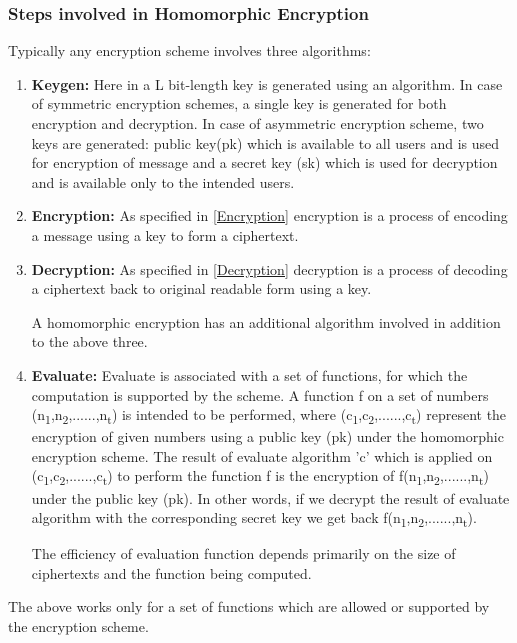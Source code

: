\subsubsection{Steps involved in Homomorphic Encryption} \label{steps}
Typically any encryption scheme involves three algorithms:
\begin{enumerate}

    \item 
    \textbf{Keygen:} Here in a L bit-length key is generated using an algorithm. In case of symmetric encryption schemes, a single key is generated for both encryption and decryption. In case of asymmetric encryption scheme, two keys are generated: public key(pk) which is available to all users and is used for encryption of message and a secret key (sk) which is used for decryption and is available only to the intended users.
   
   \item
    \textbf{Encryption:} As specified in \ref{Encryption} encryption is a process of encoding a message using a key to form a ciphertext.
   
    \item
    \textbf{Decryption:} As specified in \ref{Decryption} decryption is a process of decoding a ciphertext back to original readable form using a key.
   
   \noindent A homomorphic encryption has an additional algorithm involved in addition to the above three.
   
    \item 
     \textbf{Evaluate:} Evaluate is associated with a set of functions, for which the computation is supported by the scheme. A function f on a set of numbers (n\textsubscript{1},n\textsubscript{2},......,n\textsubscript{t}) is intended to be performed, where (c\textsubscript{1},c\textsubscript{2},......,c\textsubscript{t}) represent the encryption of given numbers using a public key (pk) under the homomorphic encryption scheme. The result of evaluate algorithm 'c' which is applied on (c\textsubscript{1},c\textsubscript{2},......,c\textsubscript{t}) to perform the function f is the encryption of f(n\textsubscript{1},n\textsubscript{2},......,n\textsubscript{t}) under the public key (pk). In other words, if we decrypt the result of evaluate algorithm with the corresponding secret key we get back f(n\textsubscript{1},n\textsubscript{2},......,n\textsubscript{t}).
     
     \noindent The efficiency of evaluation function depends primarily on the size of ciphertexts and the function being computed.
\end{enumerate}
     The above works only for a set of functions which are allowed or supported by the encryption scheme. 
    
